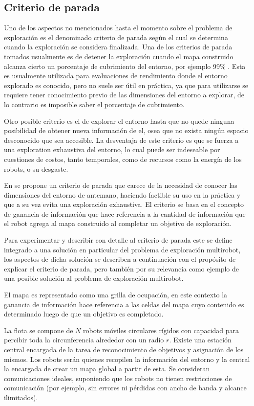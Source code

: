 \subsection{Criterio de parada}
Uno de los aspectos no mencionados hasta el momento sobre el problema de exploración es el denominado criterio de parada según el cual se determina cuando la exploración se considera finalizada. 
Una de los criterios de parada tomados usualmente es de detener la exploración cuando el mapa construido alcanza cierto un porcentaje de cubrimiento del entorno, por ejemplo 99\% \cite{Yan2015}. Esta es usualmente utilizada para evaluaciones de rendimiento donde el entorno explorado es conocido, pero no suele ser útil en práctica, ya que para utilizarse se requiere tener conocimiento previo de las dimensiones del entorno a explorar, de lo contrario es imposible saber el porcentaje de cubrimiento.

Otro posible criterio es el de explorar el entorno hasta que no quede ninguna posibilidad de obtener nueva información de el, osea que no exista ningún espacio desconocido que sea accesible. La desventaja de este criterio es que se fuerza a una exploration exhaustiva del entorno, lo cual puede ser indeseable por cuestiones de costos, tanto temporales, como de recursos como la energía de los robots, o su desgaste.

En \cite{amorin2019novel} se propone un criterio de parada que carece de la necesidad de conocer las dimensiones del entorno de antemano, haciendo factible su uso en la práctica y que a su vez evita una exploración exhaustiva. El criterio se basa en el concepto de ganancia de información que hace referencia a la cantidad de información que el robot agrega al mapa construido al completar un objetivo de exploración. 

Para experimentar y describir con detalle al criterio de parada este se define integrado a una solución en particular del problema de exploración multirobot, los aspectos de dicha solución se describen a continuación con el propósito de explicar el criterio de parada, pero también por su relevancia como ejemplo de una posible solución al problema de exploración multirobot.

El mapa es representado como una grilla de ocupación, en este contexto la ganancia de información hace referencia a las celdas del mapa cuyo contenido es determinado luego de que un objetivo es completado. 

La flota se compone de $N$ robots móviles circulares rígidos con capacidad para percibir toda la circunferencia alrededor con un radio $r$. Existe una estación central encargada de la tarea de reconocimiento de objetivos y asignación de los mismos. Los robots serán quienes recopilen la información del entorno y la central la encargada de crear un mapa global a partir de esta. Se consideran comunicaciones ideales, suponiendo que los robots no tienen restricciones de comunicación (por ejemplo, sin errores ni pérdidas con ancho de banda y alcance ilimitados). %


